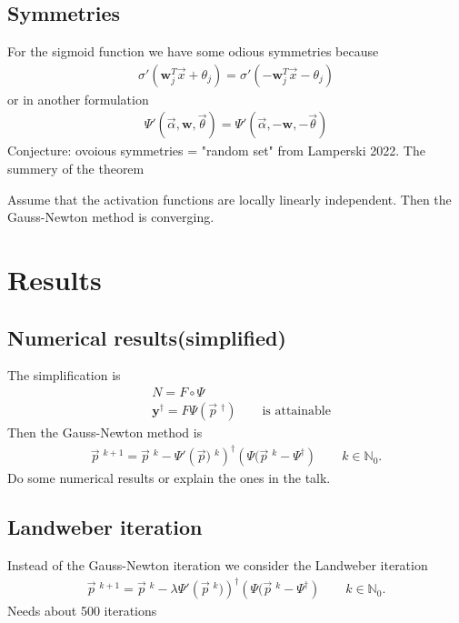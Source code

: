 \subsection{Symmetries}
For the sigmoid function we have some odious symmetries because
\begin{align}
    \sigma'(\mathbf{w}^{T}_j \vec{x} + \theta_j)
    = \sigma'\left(-\mathbf{w}_j^{T}\vec{x} - \theta_j  \right)
\end{align}
or in another formulation
\begin{align}
    \Psi'(\vec{\alpha}, \mathbf{w}, \vec{\theta}) = \Psi'(\vec{\alpha},
        -\mathbf{w}, -\vec{\theta})
\end{align}
Conjecture: ovoious symmetries = "random set" from Lamperski 2022. The
summery of the theorem
\begin{theorem}
    Assume that the activation functions are locally linearly independent.
    Then the Gauss-Newton method is converging.
\end{theorem}
\section{Results}
\subsection{Numerical results(simplified)}
The simplification is
\begin{align}
    &N = F \circ \Psi \\
    &\mathbf{y}^{\dagger} = F\Psi(\vec{p}\;^{\dagger}) \qquad \text{is
    attainable}
\end{align}
Then the Gauss-Newton method is
\begin{align}
    \vec{p}\;^{k+1} = \vec{p}\;^{k} - \Psi'\left(\vec{p})\;^{k}  \right)^{\dagger}
    \left( \Psi(\vec{p}\;^{k} - \Psi^{\dagger} \right) \qquad k \in
    \mathbb{N}_0.
\end{align}
Do some numerical  results or explain the ones in the talk.
\subsection{Landweber iteration}
Instead of the Gauss-Newton iteration we consider the Landweber iteration
\begin{align}
    \vec{p}\;^{k+1} = \vec{p}\;^{k} - \lambda \Psi'\left(\vec{p}\;^{k})  \right)^{\dagger}
    \left( \Psi(\vec{p}\;^{k} - \Psi^{\dagger} \right) \qquad k \in
    \mathbb{N}_0.
\end{align}
Needs about 500 iterations
